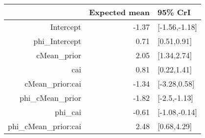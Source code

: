 \begin{tabular}{rrl}
  \hline
 & Expected mean & 95\% CrI \\ 
  \hline
Intercept & -1.37 & [-1.56,-1.18] \\ 
  phi\_Intercept & 0.71 & [0.51,0.91] \\ 
  cMean\_prior & 2.05 & [1.34,2.74] \\ 
  cai & 0.81 & [0.22,1.41] \\ 
  cMean\_prior:cai & -1.34 & [-3.28,0.58] \\ 
  phi\_cMean\_prior & -1.82 & [-2.5,-1.13] \\ 
  phi\_cai & -0.61 & [-1.08,-0.14] \\ 
  phi\_cMean\_prior:cai & 2.48 & [0.68,4.29] \\ 
   \hline
\end{tabular}


